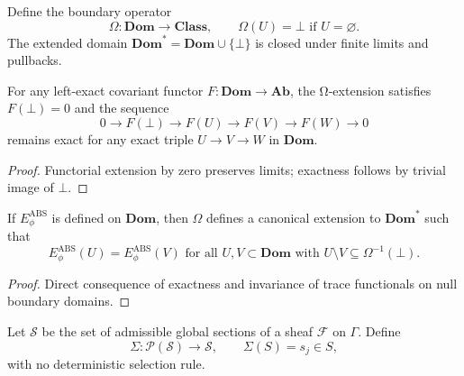 
\begin{definition}\label{def:omega}
Define the boundary operator
\[
\Omega:\mathbf{Dom}\longrightarrow\mathbf{Class},\qquad
\Omega(U)=\bot\text{ if }U=\varnothing.
\]
The extended domain $\mathbf{Dom}^{*}=\mathbf{Dom}\cup\{\bot\}$ is closed under finite limits and pullbacks.
\end{definition}

\begin{lemma}\label{lem:omega-closure}
For any left-exact covariant functor $F:\mathbf{Dom}\to\mathbf{Ab}$, 
the Ω-extension satisfies $F(\bot)=0$ and the sequence
\[
0\to F(\bot)\to F(U)\to F(V)\to F(W)\to0
\]
remains exact for any exact triple $U\to V\to W$ in $\mathbf{Dom}$.
\end{lemma}

\begin{proof}
Functorial extension by zero preserves limits; exactness follows by trivial image of $\bot$. \relax
\end{proof}

\begin{theorem}\label{thm:omega-regularity}
If $E_\phi^{\mathrm{ABS}}$ is defined on $\mathbf{Dom}$, then $\Omega$ defines a canonical extension to $\mathbf{Dom}^{*}$ such that 
\[
E_\phi^{\mathrm{ABS}}(U)=E_\phi^{\mathrm{ABS}}(V)
\text{ for all }U,V\subset\mathbf{Dom}
\text{ with }U\setminus V\subseteq\Omega^{-1}(\bot).
\]
\end{theorem}

\begin{proof}
Direct consequence of exactness and invariance of trace functionals on null boundary domains. \relax
\end{proof}


\begin{definition}\label{def:sigma}
Let $\mathcal{S}$ be the set of admissible global sections of a sheaf $\mathcal F$ on $\Gamma$.
Define
\[
\Sigma:\mathcal{P}(\mathcal S)\longrightarrow\mathcal S,\qquad
\Sigma(S)=s_j\in S,
\]
with no deterministic selection rule.
\end{definition}

